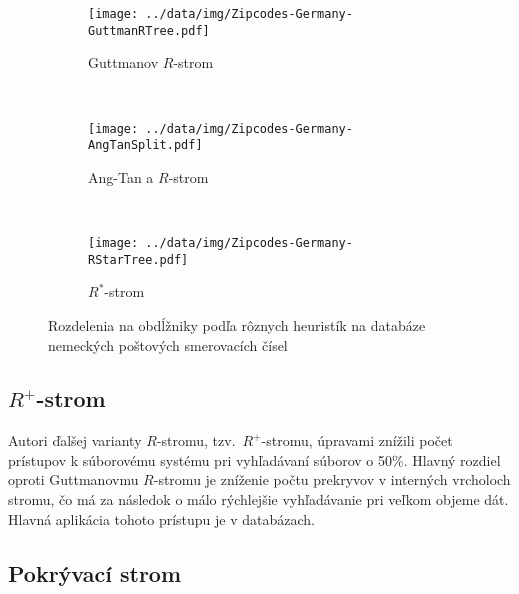 \documentclass[12pt,a4paper,oneside]{article}
\begin{document}
{\begin{figure}
        \centering
        \begin{subfigure}[b]{0.3\textwidth}
                \texttt{[image: ../data/img/Zipcodes-Germany-GuttmanRTree.pdf]}
                \caption{Guttmanov $R$-strom \citep{RTreeSplitImg}}
                \label{fig:RTreeSplit}
        \end{subfigure}
        ~ %
        \begin{subfigure}[b]{0.31\textwidth}
                \texttt{[image: ../data/img/Zipcodes-Germany-AngTanSplit.pdf]}
                \caption{Ang-Tan \citep{ang97} a $R$-strom \citep{AngTanSplitImg}}
                \label{fig:AngTanSplit}
        \end{subfigure}
        ~ %
        \begin{subfigure}[b]{0.3\textwidth}
                \texttt{[image: ../data/img/Zipcodes-Germany-RStarTree.pdf]}
                \caption{$R^*$-strom \citep{RStarTreeSplitImg}}
                \label{fig:RStarTreeSplit}
        \end{subfigure}%
        \caption{Rozdelenia na obdĺžniky podľa rôznych heuristík na databáze nemeckých poštových smerovacích čísel}\label{fig:Splits}
\end{figure}

\FloatBarrier

\subsection{$R^+$-strom}\label{rplustree}

Autori \citet{Sellis87} ďalšej varianty $R$-stromu, tzv.~$R^+$-stromu, úpravami znížili počet prístupov k súborovému systému pri vyhľadávaní súborov o 50\%. Hlavný rozdiel oproti Guttmanovmu $R$-stromu je zníženie počtu prekryvov v interných vrcholoch stromu, čo má za následok o málo rýchlejšie vyhľadávanie pri veľkom objeme dát. Hlavná aplikácia tohoto prístupu je v databázach.

\subsection{Pokrývací strom}\label{covertree}

}
\end{document}

